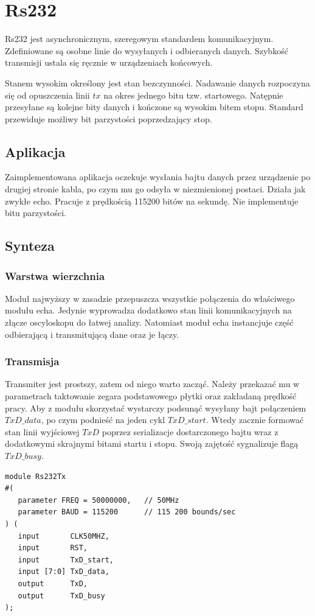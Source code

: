 \documentclass[a4paper,12pt]{article}
\begin{document}
\newpage
\section{Rs232}

Rs232 jest asynchronicznym, szeregowym standardem komunikacyjnym. Zdefiniowane są osobne linie do wysyłanych i odbieranych danych. Szybkość transmisji ustala się ręcznie w urządzeniach końcowych.

Stanem wysokim określony jest stan bezczynności. Nadawanie danych rozpoczyna się od opuszczenia linii $tx$ na okres jednego bitu tzw. startowego. Natępnie przesyłane są kolejne bity danych i kończone są wysokim bitem stopu. Standard przewiduje możliwy bit parzystości poprzedzający stop.

\subsection{Aplikacja}
Zaimplementowana aplikacja oczekuje wysłania bajtu danych przez urządzenie po drugiej stronie kabla, po czym mu go odsyła w niezmienionej postaci. Działa jak zwykłe echo. Pracuje z prędkością 115200 bitów na sekundę. Nie implementuje bitu parzystości.

\subsection{Synteza}

\subsubsection{Warstwa wierzchnia}
Moduł najwyższy w zasadzie przepuszcza wszystkie połączenia do właściwego modułu echa. Jedynie wyprowadza dodatkowo stan linii komunikacyjnych na złącze oscyloskopu do łatwej analizy. Natomiast moduł echa instancjuje część odbierającą i transmitującą dane oraz je łączy.



\subsubsection{Transmisja}
Transmiter jest prostszy, zatem od niego warto zacząć. Należy przekazać mu w parametrach taktowanie zegara podstawowego płytki oraz zakładaną prędkość pracy. Aby z modułu skorzystać wystarczy podsunąć wysyłany bajt połączeniem $TxD\_data$, po czym podnieść na jeden cykl $TxD\_start$. Wtedy zacznie formować stan linii wyjściowej $TxD$ poprzez serializacje dostarczonego bajtu wraz z dodatkowymi skrajnymi bitami startu i stopu. Swoją zajętość sygnalizuje flagą $TxD\_busy$.
\begin{lstlisting}[label=Rs232Tx,caption=Rs232Tx.v]
module Rs232Tx
#(
   parameter FREQ = 50000000,   // 50MHz
   parameter BAUD = 115200      // 115 200 bounds/sec
) (
   input       CLK50MHZ,
   input       RST,
   input       TxD_start,
   input [7:0] TxD_data,
   output      TxD,
   output      TxD_busy
);
\end{lstlisting}
\end{document}
